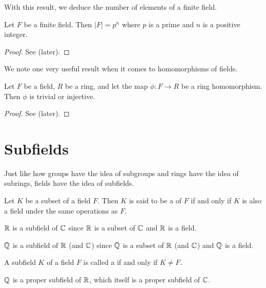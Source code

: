 With this result, we deduce the number of elements of a finite field.

\begin{theorem}\label{thrm-finite-field-has-prime-power-order}
    Let $F$ be a finite field. Then $|F| = p^n$ where $p$ is a prime and $n$ is a positive integer.
\end{theorem}
\begin{proof}
    See  (later).
\end{proof}

We note one very useful result when it comes to homomorphisms of fields.
\begin{theorem}\label{thrm-homomorphism-from-field-is-injective-or-trivial}
    Let $F$ be a field, $R$ be a ring, and let the map $\phi: F \to R$ be a ring homomorphism. Then $\phi$ is trivial or injective.
\end{theorem}
\begin{proof}
    See  (later).
\end{proof}

\section{Subfields}
Just like how groups have the idea of subgroups and rings have the idea of subrings, fields have the idea of subfields.
\begin{definition}
    Let $K$ be a subset of a field $F$. Then $K$ is said to be a  of $F$ if and only if $K$ is also a field under the same operations as $F$.
\end{definition}

\begin{example}
    $\mathbb{R}$ is a subfield of $\mathbb{C}$ since $\mathbb{R}$ is a subset of $\mathbb{C}$ and $\mathbb{R}$ is a field.
\end{example}
\begin{example}
    $\mathbb{Q}$ is a subfield of $\mathbb{R}$ (and $\mathbb{C}$) since $\mathbb{Q}$ is a subset of $\mathbb{R}$ (and $\mathbb{C}$) and $\mathbb{Q}$ is a field.
\end{example}

\begin{definition}
    A subfield $K$ of a field $F$ is called a  if and only if $K \neq F$.
\end{definition}

\begin{example}
    $\mathbb{Q}$ is a proper subfield of $\mathbb{R}$, which itself is a proper subfield of $\mathbb{C}$.
\end{example}

